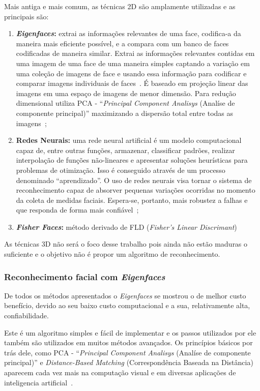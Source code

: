 Mais antiga e mais comum, as técnicas 2D são amplamente utilizadas e as principais são:
	\begin{enumerate}
		\item \textbf{\textit{Eigenfaces}:} extrai as informações relevantes de uma face, codifica-a da maneira mais eficiente possível, e a compara com um banco de faces codificadas de maneira similar. Extrai as informações relevantes contidas em uma imagem de uma face de uma maneira simples captando a variação em uma coleção de imagens de face e usando essa informação para codificar e comparar imagens individuais de faces~\cite{turk}. É baseado em projeção linear das imagens em uma espaço de imagens de menor dimensão. Para redução dimensional utiliza PCA - ``\textit{Principal Component Analisys} (Analíse de componente principal)'' maximizando a dispersão total entre todas as imagens~\cite{belhumeur};

		\item \textbf{Redes Neurais:} uma rede neural artificial é um modelo computacional capaz de, entre outras funções, armazenar, classificar padrões, realizar interpolação de funções não-lineares e apresentar soluções heurísticas para problemas de otimização. Isso é conseguido através de um processo denominado ``aprendizado''. O uso de redes neurais visa tornar o sistema de reconhecimento capaz de absorver pequenas variações ocorridas no momento da coleta de medidas faciais. Espera-se, portanto,  mais robustez a falhas e que responda de forma mais confiável~\cite{oliveira};

		\item \textbf{\textit{Fisher Faces}:} método derivado de FLD (\textit{Fisher's Linear Discrimant})
	\end{enumerate}

As técnicas 3D não será o foco desse trabalho pois ainda não estão maduras o suficiente e o objetivo não é propor um algoritmo de reconhecimento.

\subsubsection{Reconhecimento facial com \textit{Eigenfaces}}

De todos os métodos apresentados o \textit{Eigenfaces} se mostrou o de melhor custo benefício, devido ao seu baixo custo computacional e a sua, relativamente alta, confiabilidade.

Este é um algoritmo simples e fácil de implementar e os passos utilizados por ele também são utilizados em muitos métodos avançados. Os princípios básicos por trás dele, como PCA - ``\textit{Principal Component Analisys} (Analíse de componente principal)'' e \textit{Distance-Based Matching} (Correspondência Baseada na Distância) aparecem cada vez mais na computação visual e em diversas aplicações de inteligencia artificial~\cite{hewitt}.

